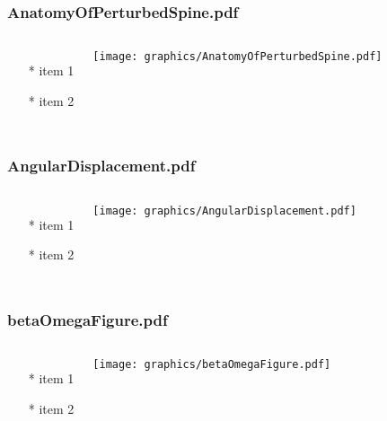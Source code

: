 \documentclass{beamer}
\begin{document}
\begin{frame} \frametitle{AnatomyOfPerturbedSpine.pdf}
    \begin{columns}[c]
        \begin{itemize}
            \item[*] item 1
            \item[*] item 2
        \end{itemize}
        \begin{minipage}{\linewidth}
            \begin{center}
            \texttt{[image: graphics/AnatomyOfPerturbedSpine.pdf]}
            \label{gfx:AnatomyOfPerturbedSpine.pdf}
            \end{center}
        \end{minipage}
    \end{columns}
\end{frame}
\begin{frame} \frametitle{AngularDisplacement.pdf}
    \begin{columns}[c]
        \begin{itemize}
            \item[*] item 1
            \item[*] item 2
        \end{itemize}
        \begin{minipage}{\linewidth}
            \begin{center}
            \texttt{[image: graphics/AngularDisplacement.pdf]}
            \label{gfx:AngularDisplacement.pdf}
            \end{center}
        \end{minipage}
    \end{columns}
\end{frame}
\begin{frame} \frametitle{betaOmegaFigure.pdf}
    \begin{columns}[c]
        \begin{itemize}
            \item[*] item 1
            \item[*] item 2
        \end{itemize}
        \begin{minipage}{\linewidth}
            \begin{center}
            \texttt{[image: graphics/betaOmegaFigure.pdf]}
            \label{gfx:betaOmegaFigure.pdf}
            \end{center}
        \end{minipage}
    \end{columns}
\end{frame}
\end{document}
